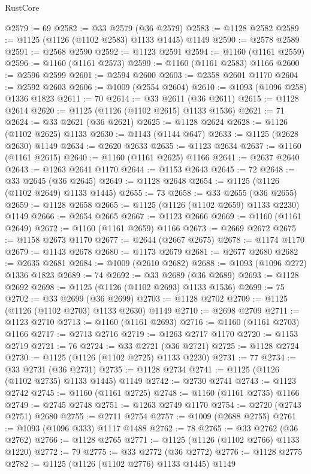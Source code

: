 \begin{lexlean}{RustCore}
\begin{coremodule}
@2579 := 69
@2582 := @33 @2579 (@36 @2579)
@2583 := @1128 @2582
@2589 := @1125 (@1126 (@1102 @2583) @1133 @1445) @1149
@2590 := @2578 @2589
@2591 := @2568 @2590
@2592 := @1123 @2591
@2594 := @1160 (@1161 @2559)
@2596 := @1160 (@1161 @2573)
@2599 := @1160 (@1161 @2583) @1166
@2600 := @2596 @2599
@2601 := @2594 @2600
@2603 := @2358 @2601 @1170
@2604 := @2592 @2603
@2606 := @1009 (@2554 @2604)
@2610 := @1093 (@1096 @258) @1336 @1823
@2611 := 70
@2614 := @33 @2611 (@36 @2611)
@2615 := @1128 @2614
@2620 := @1125 (@1126 (@1102 @2615) @1133 @1536)
@2621 := 71
@2624 := @33 @2621 (@36 @2621)
@2625 := @1128 @2624
@2628 := @1126 (@1102 @2625) @1133
@2630 := @1143 (@1144 @647)
@2633 := @1125 (@2628 @2630) @1149
@2634 := @2620 @2633
@2635 := @1123 @2634
@2637 := @1160 (@1161 @2615)
@2640 := @1160 (@1161 @2625) @1166
@2641 := @2637 @2640
@2643 := @1263 @2641 @1170
@2644 := @1153 @2643
@2645 := 72
@2648 := @33 @2645 (@36 @2645)
@2649 := @1128 @2648
@2654 := @1125 (@1126 (@1102 @2649) @1133 @1445)
@2655 := 73
@2658 := @33 @2655 (@36 @2655)
@2659 := @1128 @2658
@2665 := @1125 (@1126 (@1102 @2659) @1133 @2230) @1149
@2666 := @2654 @2665
@2667 := @1123 @2666
@2669 := @1160 (@1161 @2649)
@2672 := @1160 (@1161 @2659) @1166
@2673 := @2669 @2672
@2675 := @1158 @2673 @1170
@2677 := @2644 (@2667 @2675)
@2678 := @1174 @1170
@2679 := @1143 @2678
@2680 := @1173 @2679
@2681 := @2677 @2680
@2682 := @2635 @2681
@2684 := @1009 (@2610 @2682)
@2688 := @1093 (@1096 @272) @1336 @1823
@2689 := 74
@2692 := @33 @2689 (@36 @2689)
@2693 := @1128 @2692
@2698 := @1125 (@1126 (@1102 @2693) @1133 @1536)
@2699 := 75
@2702 := @33 @2699 (@36 @2699)
@2703 := @1128 @2702
@2709 := @1125 (@1126 (@1102 @2703) @1133 @2630) @1149
@2710 := @2698 @2709
@2711 := @1123 @2710
@2713 := @1160 (@1161 @2693)
@2716 := @1160 (@1161 @2703) @1166
@2717 := @2713 @2716
@2719 := @1263 @2717 @1170
@2720 := @1153 @2719
@2721 := 76
@2724 := @33 @2721 (@36 @2721)
@2725 := @1128 @2724
@2730 := @1125 (@1126 (@1102 @2725) @1133 @2230)
@2731 := 77
@2734 := @33 @2731 (@36 @2731)
@2735 := @1128 @2734
@2741 := @1125 (@1126 (@1102 @2735) @1133 @1445) @1149
@2742 := @2730 @2741
@2743 := @1123 @2742
@2745 := @1160 (@1161 @2725)
@2748 := @1160 (@1161 @2735) @1166
@2749 := @2745 @2748
@2751 := @1263 @2749 @1170
@2754 := @2720 (@2743 @2751) @2680
@2755 := @2711 @2754
@2757 := @1009 (@2688 @2755)
@2761 := @1093 (@1096 @333) @1117 @1488
@2762 := 78
@2765 := @33 @2762 (@36 @2762)
@2766 := @1128 @2765
@2771 := @1125 (@1126 (@1102 @2766) @1133 @1220)
@2772 := 79
@2775 := @33 @2772 (@36 @2772)
@2776 := @1128 @2775
@2782 := @1125 (@1126 (@1102 @2776) @1133 @1445) @1149

\end{coremodule}
\end{lexlean}
